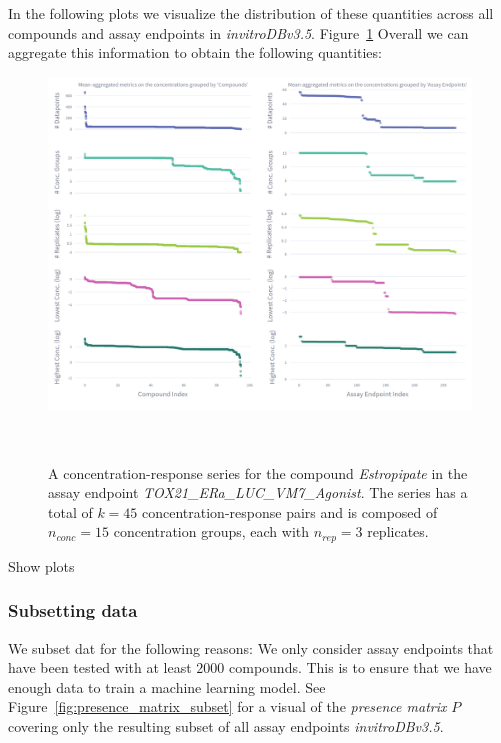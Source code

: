 In the following plots we visualize the distribution of these quantities across all compounds and assay endpoints in \textit{invitroDBv3.5}.
Figure~\ref{fig:concentration_metrics}
Overall we can aggregate this information to obtain the following quantities:
\begin{figure}[htbp]  %
    \centering
    \includegraphics[width=1.0\textwidth]{figures/concentration_metrics.png}  
    \caption{A concentration-response series for the compound \textit{Estropipate} in the assay endpoint \textit{TOX21\_ERa\_LUC\_VM7\_Agonist}. The series has a total of $k = 45$ concentration-response pairs and is composed of $n_{conc} = 15$ concentration groups, each with $n_{rep} = 3$ replicates.}
~\label{fig:concentration_metrics} 
\end{figure}

Show plots 
\subsubsection{Subsetting data}
We subset dat for the following reasons:
We only consider assay endpoints that have been tested with at least $\num{2000}$ compounds. This is to ensure that we have enough data to train a machine learning model.
See Figure~\ref{fig:presence_matrix_subset} for a visual of the \emph{presence matrix} $P$ covering only the resulting subset of all assay endpoints \textit{invitroDBv3.5}.

